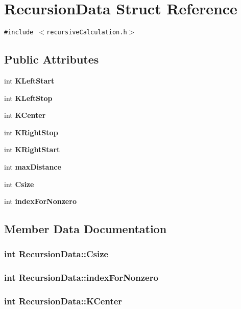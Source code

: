 \section{Recursion\-Data Struct Reference}
\label{structRecursionData}
{\tt \#include $<$recursive\-Calculation.h$>$}

\subsection*{Public Attributes}
\begin{CompactItemize}
\item 
int \bf{KLeft\-Start}
\item 
int \bf{KLeft\-Stop}
\item 
int \bf{KCenter}
\item 
int \bf{KRight\-Stop}
\item 
int \bf{KRight\-Start}
\item 
int \bf{max\-Distance}
\item 
int \bf{Csize}
\item 
int \bf{index\-For\-Nonzero}
\end{CompactItemize}


\subsection{Member Data Documentation}
\subsubsection{\setlength{\rightskip}{0pt plus 5cm}int \bf{Recursion\-Data::Csize}}\label{structRecursionData_971f64de9bd03c3f2c91c528554f6d40}


\subsubsection{\setlength{\rightskip}{0pt plus 5cm}int \bf{Recursion\-Data::index\-For\-Nonzero}}\label{structRecursionData_b8b2f77913abeebdf8681d672ea0b7ff}


\subsubsection{\setlength{\rightskip}{0pt plus 5cm}int \bf{Recursion\-Data::KCenter}}\label{structRecursionData_c6d4b57fe47bbae3aa19be50fa004fc8}


